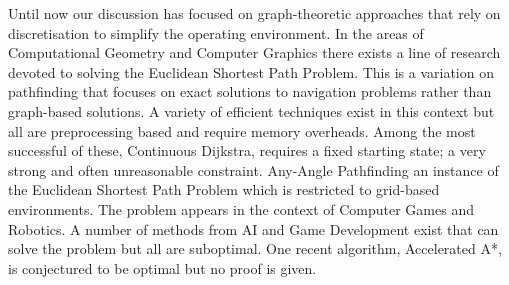 Until now our discussion has focused on graph-theoretic approaches that rely
on discretisation to simplify the operating environment. In the areas of
Computational Geometry and Computer Graphics there exists a line of research
devoted to solving the Euclidean Shortest Path Problem. This is a variation on
pathfinding that focuses on exact solutions to navigation problems rather than
graph-based solutions. A variety of efficient techniques exist in this context
but all are preprocessing based and require memory overheads. Among the most
successful of these, Continuous Dijkstra, requires a fixed starting state; a
very strong and often unreasonable constraint.  Any-Angle Pathfinding an
instance of the Euclidean Shortest Path Problem which is restricted to
grid-based environments. The problem appears in the context of Computer Games
and Robotics.  A number of methods from AI and Game Development exist that can
solve the problem but all are suboptimal. One recent algorithm, Accelerated
A{*}, is conjectured to be optimal but no proof is given.

